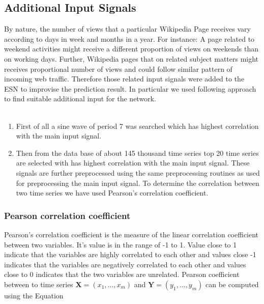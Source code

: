  \subsection{Additional Input Signals}

 
 \indent \indent
 By nature, the number of views that a particular Wikipedia Page receives vary according to  days in week and months in a year. For instance: A page related to weekend activities might receive a different proportion of views on weekends than on working days. Further, Wikipedia pages that on related subject matters might receives proportional number of views and could follow similar pattern of incoming web traffic. Therefore those related input signals were added to the ESN to improvise the prediction result. In particular we used following approach to find suitable additional input for the network. \\\\
 
 \begin{enumerate}
	 \item First of all a sine wave of period 7 was searched which has highest correlation with the main input signal. 
	 \item Then from the data base of about 145 thousand time series top 20 time series are selected with has highest correlation with the main input signal. These signals are further preprocessed using the same preprocessing routines as used for preprocessing the main input signal. To determine the correlation between two time series we have used Pearson's correlation coefficient.
	 
 \end{enumerate}
 
 
 
 \subsubsection{Pearson correlation coefficient}
  Pearson's correlation coefficient is the measure of the linear correlation coefficient between two variables. It's value is in the range of -1 to 1. Value close to 1 indicate that the variables are highly correlated to each other and values close -1 indicates that the variables are negatively correlated to each other and values close to 0 indicates that the two variables are unrelated. Pearson coefficient between to time series $\mathbf{X} = (x_1, \hdots, x_m)$ and $\mathbf{Y} = (y_1, \hdots, y_m)$ can be computed using the Equation %
  
